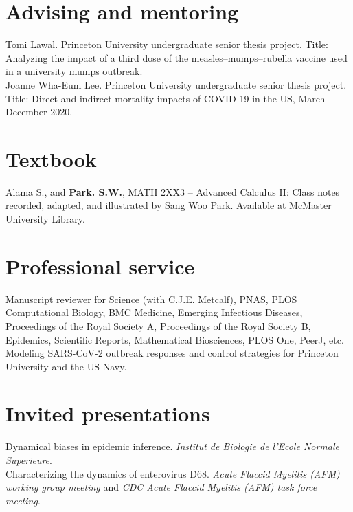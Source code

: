 \documentclass[11pt]{article} %
\begin{document}
\section*{Advising and mentoring}

 Tomi Lawal. Princeton University undergraduate senior thesis project. Title: Analyzing the impact of a third dose of the measles--mumps--rubella vaccine used in a university mumps outbreak.\\

 Joanne Wha-Eum Lee. Princeton University undergraduate senior thesis project. Title: Direct and indirect mortality impacts of COVID-19 in the US, March--December 2020.

\section*{Textbook}

 Alama S., and \textbf{Park. S.W.}, MATH 2XX3 -- Advanced Calculus II: Class notes recorded, adapted, and illustrated by Sang Woo Park. Available at McMaster University Library.

\section*{Professional service}

Manuscript reviewer for Science (with C.J.E. Metcalf), PNAS, PLOS Computational Biology, BMC Medicine, Emerging Infectious Diseases, Proceedings of the Royal Society A, Proceedings of the Royal Society B, Epidemics, Scientific Reports, Mathematical Biosciences, PLOS One, PeerJ, etc.\\

Modeling SARS-CoV-2 outbreak responses and control strategies for Princeton University and the US Navy. 

\section*{Invited presentations}

 Dynamical biases in epidemic inference. \textit{Institut de Biologie de l'Ecole Normale Superieure}.\\

 Characterizing the dynamics of enterovirus D68. \textit{Acute Flaccid Myelitis (AFM) working group meeting} and \textit{CDC Acute Flaccid Myelitis (AFM) task force meeting}.\\
\end{document}
